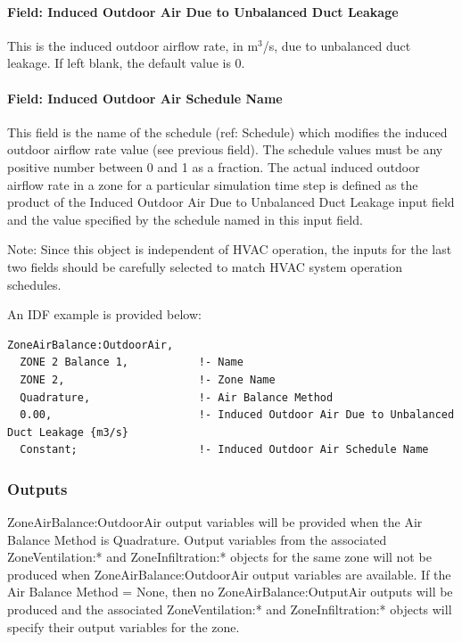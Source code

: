 \paragraph{Field: Induced Outdoor Air Due to Unbalanced Duct Leakage}\label{field-induced-outdoor-air-due-to-unbalanced-duct-leakage}

This is the induced outdoor airflow rate, in m\(^{3}\)/s, due to unbalanced duct leakage. If left blank, the default value is 0.

\paragraph{Field: Induced Outdoor Air Schedule Name}\label{field-induced-outdoor-air-schedule-name}

This field is the name of the schedule (ref: Schedule) which modifies the induced outdoor airflow rate value (see previous field). The schedule values must be any positive number between 0 and 1 as a fraction. The actual induced outdoor airflow rate in a zone for a particular simulation time step is defined as the product of the Induced Outdoor Air Due to Unbalanced Duct Leakage input field and the value specified by the schedule named in this input field.

Note: Since this object is independent of HVAC operation, the inputs for the last two fields should be carefully selected to match HVAC system operation schedules.

An IDF example is provided below:

\begin{lstlisting}
ZoneAirBalance:OutdoorAir,
  ZONE 2 Balance 1,           !- Name
  ZONE 2,                     !- Zone Name
  Quadrature,                 !- Air Balance Method
  0.00,                       !- Induced Outdoor Air Due to Unbalanced Duct Leakage {m3/s}
  Constant;                   !- Induced Outdoor Air Schedule Name
\end{lstlisting}

\subsubsection{Outputs}\label{outputs-2-002}

ZoneAirBalance:OutdoorAir output variables will be provided when the Air Balance Method is Quadrature. Output variables from the associated ZoneVentilation:* and ZoneInfiltration:* objects for the same zone will not be produced when ZoneAirBalance:OutdoorAir output variables are available. If the Air Balance Method = None, then no ZoneAirBalance:OutputAir outputs will be produced and the associated ZoneVentilation:* and ZoneInfiltration:* objects will specify their output variables for the zone.

